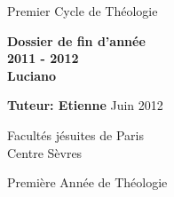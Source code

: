 \begin{titlepage}
	\begin{center}
		\textmd{Premier Cycle de Théologie}
		\vfill
		{
		\huge \textbf{Dossier de fin d'année\\
		\vfill
		2011 - 2012}\\[0.4cm]
		
			\vfill
			\vfill
			\large\textbf{Luciano }
		
		
		
			\vfill
			\large\textbf{Tuteur: Etienne }
			\vfill
			Juin 2012\\
		
			\vfill
		
			Facultés jésuites de Paris\\
			Centre Sèvres\\
		}
		\vfill
	\end{center}
	
	\begin{flushright}
		Première Année de Théologie
	\end{flushright}

\end{titlepage}